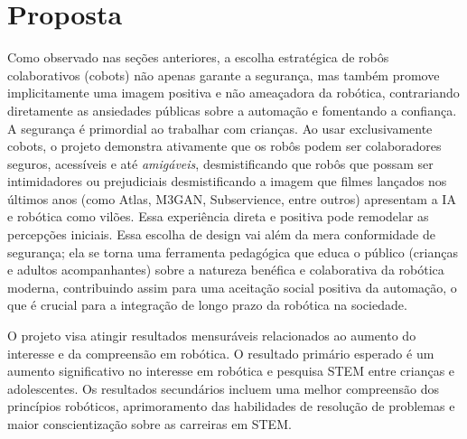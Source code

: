 \documentclass[%
  a4paper,%
  12pt,%
  fleqn,%
  english,%
  brazilian,%
]{article}
\begin{document}
\section{Proposta}
Como observado nas seções anteriores, a escolha estratégica de robôs colaborativos (cobots) não apenas garante a segurança, mas também promove implicitamente uma imagem positiva e não ameaçadora da robótica, contrariando diretamente as ansiedades públicas sobre a automação e fomentando a confiança. A segurança é primordial ao trabalhar com crianças. Ao usar exclusivamente cobots, o projeto demonstra ativamente que os robôs podem ser colaboradores seguros, acessíveis e até \emph{amigáveis}, desmistificando que robôs que possam ser intimidadores ou prejudiciais desmistificando a imagem que filmes lançados nos últimos anos (como Atlas, M3GAN, Subservience, entre outros) apresentam a IA e robótica como vilões. Essa experiência direta e positiva pode remodelar as percepções iniciais. Essa escolha de design vai além da mera conformidade de segurança; ela se torna uma ferramenta pedagógica que educa o público (crianças e adultos acompanhantes) sobre a natureza benéfica e colaborativa da robótica moderna, contribuindo assim para uma aceitação social positiva da automação, o que é crucial para a integração de longo prazo da robótica na sociedade.

O projeto visa atingir resultados mensuráveis relacionados ao aumento do interesse e da compreensão em robótica. O resultado primário esperado é um aumento significativo no interesse em robótica e pesquisa STEM entre crianças e adolescentes. Os resultados secundários incluem uma melhor compreensão dos princípios robóticos, aprimoramento das habilidades de resolução de problemas e maior conscientização sobre as carreiras em STEM.
\end{document}

